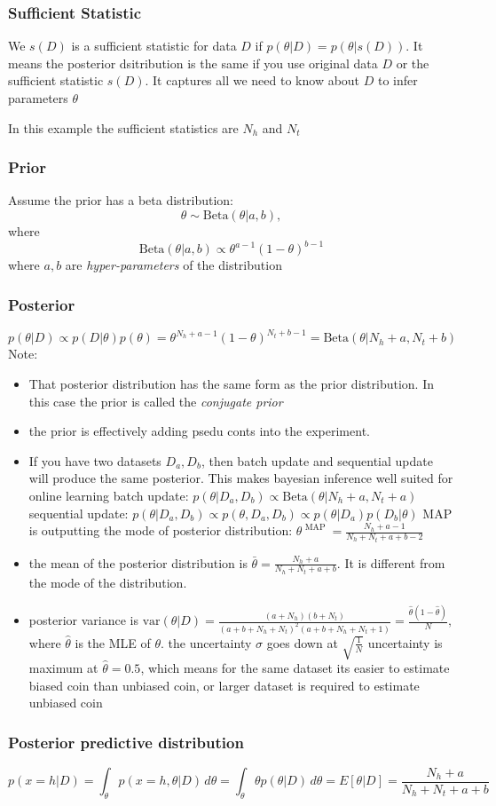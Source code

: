 \documentclass[11pt]{article}
\begin{document}
\subsubsection{Sufficient Statistic}
We $s(D)$ is a sufficient statistic for data $D$ if $p(\theta|D)=p(\theta|s(D))$. It means the posterior dsitribution is the same if you use original data $D$ or the sufficient statistic $s(D)$. It captures all we need to know about $D$ to infer parameters $\theta$

In this example the sufficient statistics are $N_h$ and $N_t$

\subsubsection{Prior}
Assume the prior has a beta distribution:
\[
\theta \sim \mathrm{Beta}(\theta|a,b),
\]
where
\[
\mathrm{Beta}(\theta|a,b) \propto \theta^{a-1}(1-\theta)^{b-1}
\]
where $a,b$ are \emph{hyper-parameters} of the distribution

\subsubsection{Posterior}
\[
p(\theta|D) \propto p(D|\theta)p(\theta) = \theta^{N_h+a-1}(1-\theta)^{N_t+b-1} = \mathrm{Beta}(\theta|N_h+a,N_t+b)
\]
Note:
\begin{itemize}
\item That posterior distribution has the same form as the prior distribution. In this case the prior is called the \emph{conjugate prior}
\item the prior is effectively adding psedu conts into the experiment.
\item If you have two datasets $D_a,D_b$, then batch update and sequential update will produce the same posterior. This makes bayesian inference well suited for online learning
\subitem batch update: $p(\theta|D_a,D_b) \propto \mathrm{Beta}(\theta|N_h+a,N_t+a)$
\subitem sequential update: $p(\theta|D_a,D_b) \propto p(\theta,D_a,D_b) \propto p(\theta|D_a)p(D_b|\theta)$
\subitem MAP is outputting the mode of posterior distribution: $\theta^{\mbox{ MAP }} = \frac{N_h+a-1}{N_h+N_t+a+b-2}$
\item the mean of the posterior distribution is $\bar{\theta} = \frac{N_h+a}{N_h+N_t+a+b}$. It is different from the mode of the distribution.
\item posterior variance is $\mathrm{var}(\theta|D) = \frac{(a+N_h)(b+N_t)}{(a+b+N_h+N_t)^2(a+b+N_h+N_t+1)} = \frac{\hat\theta(1- \hat\theta)}{N},$ where $\hat\theta$ is the MLE of $\theta$. 
\subitem the uncertainty $\sigma$ goes down at $\sqrt{\frac{1}{N}}$
\subitem uncertainty is maximum at $\hat\theta = 0.5$, which means for the same dataset its easier to estimate biased coin than unbiased coin, or larger dataset is required to estimate unbiased coin
\end{itemize}

\subsubsection{Posterior predictive distribution}
\[
p(x=h|D) = \int_\theta p(x=h,\theta|D)\,d\theta = \int_\theta \theta p(\theta|D)\,d\theta = E[\theta|D] = \frac{N_h+a}{N_h+N_t+a+b}
\]
\end{document}
